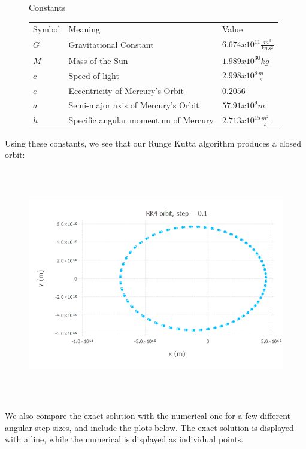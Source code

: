 \documentclass{article}
\begin{document}
\begin{figure}[H]{Constants}
\begin{tabular}{l l l}
Symbol & Meaning & Value \\
$G$ & Gravitational Constant & $6.674 x 10^{11} \frac{m^3}{kg\,s^2}$\cite{sju}\\
$M$ & Mass of the Sun & $1.989 x 10^{30} kg$ \cite{nasa}\\
$c$ & Speed of light & $2.998 x 10^8 \frac{m}{s}$ \cite{sju}\\
$e$ & Eccentricity of Mercury's Orbit & $0.2056$ \cite{nasa} \\
$a$ & Semi-major axis of Mercury's Orbit & $57.91 x 10^9 m$ \cite{nasa} \\
$h$ & Specific angular momentum of Mercury & $2.713 x 10^{15} \frac{m^2}{s}$ \cite{nasa}
\end{tabular}
\end{figure}

Using these constants, we see that our Runge Kutta algorithm produces a closed orbit:

\begin{figure}[H]
	\includegraphics[width=6in,height=4in]{"rk4orbit"}
\end{figure}

We also compare the exact solution with the numerical one for a few different angular step sizes, and include the plots below. The exact solution is displayed with a line, while the numerical is displayed as individual points.
\end{document}
